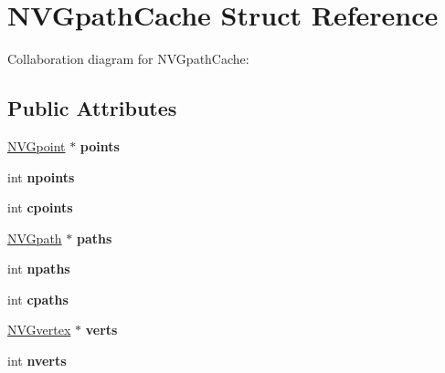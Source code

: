 \hypertarget{struct_n_v_gpath_cache}{\section{N\+V\+Gpath\+Cache Struct Reference}
\label{struct_n_v_gpath_cache}
}


Collaboration diagram for N\+V\+Gpath\+Cache\+:
\subsection*{Public Attributes}
\begin{DoxyCompactItemize}
\item 
\hypertarget{struct_n_v_gpath_cache_a48a2a05630806866aa7090f0d6ff6a6f}{\hyperlink{struct_n_v_gpoint}{N\+V\+Gpoint} $\ast$ {\bfseries points}}\label{struct_n_v_gpath_cache_a48a2a05630806866aa7090f0d6ff6a6f}

\item 
\hypertarget{struct_n_v_gpath_cache_acafbab0856b18f16da4f3c89398e53c2}{int {\bfseries npoints}}\label{struct_n_v_gpath_cache_acafbab0856b18f16da4f3c89398e53c2}

\item 
\hypertarget{struct_n_v_gpath_cache_aaa71429e6c6365908200a6736c31238d}{int {\bfseries cpoints}}\label{struct_n_v_gpath_cache_aaa71429e6c6365908200a6736c31238d}

\item 
\hypertarget{struct_n_v_gpath_cache_a29017741079e5c1989467464171659a9}{\hyperlink{struct_n_v_gpath}{N\+V\+Gpath} $\ast$ {\bfseries paths}}\label{struct_n_v_gpath_cache_a29017741079e5c1989467464171659a9}

\item 
\hypertarget{struct_n_v_gpath_cache_ae9d1bebaf2bd3192ac194925dbf63c37}{int {\bfseries npaths}}\label{struct_n_v_gpath_cache_ae9d1bebaf2bd3192ac194925dbf63c37}

\item 
\hypertarget{struct_n_v_gpath_cache_abb81be8794e77f4f587d2e4052410c76}{int {\bfseries cpaths}}\label{struct_n_v_gpath_cache_abb81be8794e77f4f587d2e4052410c76}

\item 
\hypertarget{struct_n_v_gpath_cache_ad35304be5d5bdd46db315f699e7e88f4}{\hyperlink{struct_n_v_gvertex}{N\+V\+Gvertex} $\ast$ {\bfseries verts}}\label{struct_n_v_gpath_cache_ad35304be5d5bdd46db315f699e7e88f4}

\item 
\hypertarget{struct_n_v_gpath_cache_a6ce92987c5d5829a029e9ad7cb6eb505}{int {\bfseries nverts}}\label{struct_n_v_gpath_cache_a6ce92987c5d5829a029e9ad7cb6eb505}


\end{DoxyCompactItemize}

